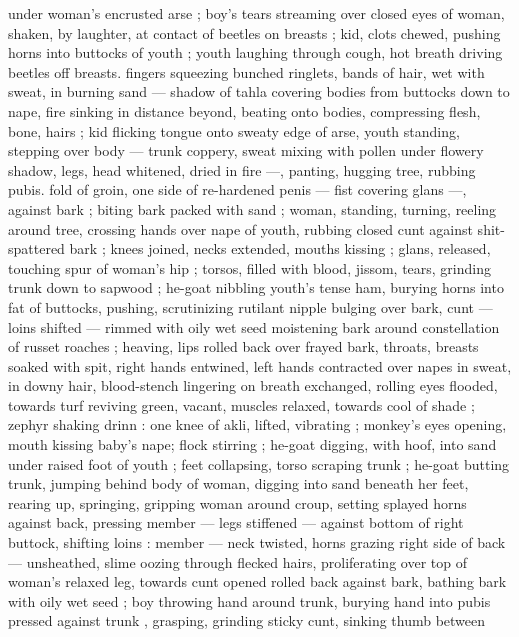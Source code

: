 under woman's encrusted arse ; boy's tears streaming over closed 
eyes of woman, shaken, by laughter, at contact of beetles on breasts 
; kid, clots chewed, pushing horns into buttocks of youth ; youth 
laughing through cough, hot breath driving beetles off breasts. 
fingers squeezing bunched ringlets, bands of hair, wet with sweat, in 
burning sand --- shadow of tahla covering bodies from buttocks 
down to nape, fire sinking in distance beyond, beating onto bodies, 
compressing flesh, bone, hairs ; kid flicking tongue onto sweaty edge 
of arse, youth standing, stepping over body --- trunk coppery, sweat 
mixing with pollen under flowery shadow, legs, head whitened, dried 
in fire ---, panting, hugging tree, rubbing pubis. fold of groin, one 
side of re-hardened penis --- fist covering glans ---, against bark ; 
biting bark packed with sand ; woman, standing, turning, reeling 
around tree, crossing hands over nape of youth, rubbing closed cunt 
against shit-spattered bark ; knees joined, necks extended, mouths 
kissing ; glans, released, touching spur of woman's hip ; torsos, filled 
with blood, jissom, tears, grinding trunk down to sapwood ; he-goat 
nibbling youth's tense ham, burying horns into fat of buttocks, 
pushing, scrutinizing rutilant nipple bulging over bark, cunt --- loins 
shifted --- rimmed with oily wet seed moistening bark around 
constellation of russet roaches ; heaving, lips rolled back over frayed 
bark, throats, breasts soaked with spit, right hands entwined, left 
hands contracted over napes in sweat, in downy hair, blood-stench 
lingering on breath exchanged, rolling eyes flooded, towards turf 
reviving green, vacant, muscles relaxed, towards cool of shade ; 
zephyr shaking drinn : one knee of akli, lifted, vibrating ; monkey's 
eyes opening, mouth kissing baby's nape; flock stirring ; he-goat 
digging, with hoof, into sand under raised foot of youth ; feet 
collapsing, torso scraping trunk ; he-goat butting trunk, jumping 
behind body of woman, digging into sand beneath her feet, rearing 
up, springing, gripping woman around croup, setting splayed horns 
against back, pressing member --- legs stiffened --- against bottom 
of right buttock, shifting loins : member --- neck twisted, horns 
grazing right side of back --- unsheathed, slime oozing through 
flecked hairs, proliferating over top of woman's relaxed leg, towards 
cunt opened rolled back against bark, bathing bark with oily wet seed 
; boy throwing hand around trunk, burying hand into pubis pressed 
against trunk , grasping, grinding sticky cunt, sinking thumb between 
